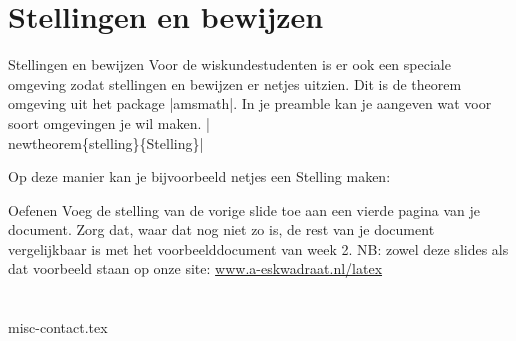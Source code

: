 \documentclass{cursuspresentatie}
\def\importslide#1#2{%
	{#2}
}
\begin{document}
\section{Stellingen en bewijzen}
\begin{frame}[allowframebreaks]{Stellingen en bewijzen}
	Voor de wiskundestudenten is er ook een speciale omgeving zodat stellingen en bewijzen er netjes uitzien.
	Dit is de theorem omgeving uit het package \hll|amsmath|.
	In je preamble kan je aangeven wat voor soort omgevingen je wil maken.
    \hll|\\newtheorem\{stelling\}\{Stelling\}|
	
	\framebreak
	Op deze manier kan je bijvoorbeeld netjes een Stelling maken:
\end{frame}

\begin{frame}{Oefenen}
	Voeg de stelling van de vorige slide toe aan een vierde pagina van je document. Zorg dat, waar dat nog niet zo is, de rest van je document vergelijkbaar is met het voorbeelddocument van week 2.
	\vfill
	NB: zowel deze slides als dat voorbeeld staan op onze site: \url{www.a-eskwadraat.nl/latex}
\end{frame}


\section{\texorpdfstring{}{Misc}}

\importslide{misc}{misc-contact.tex}


\end{document}
